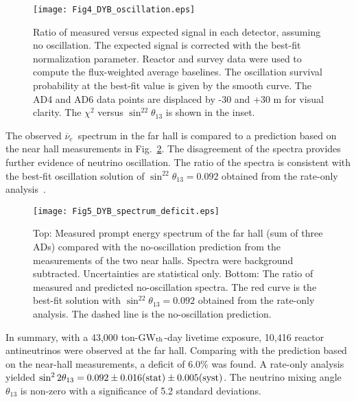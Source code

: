 \documentclass[aps,prl,showpacs,showkeys,amsmath,amssymb,
twocolumn,
floatfix,
superscriptaddress
]{revtex4-1}
\newcommand{\nuebar}{$\overline{\nu}_{e}$}
\begin{document}
\begin{figure}[htb]
\texttt{[image: Fig4\_DYB\_oscillation.eps]}
\caption{
Ratio of measured versus expected signal in each detector, assuming no oscillation. The expected signal is corrected with the best-fit normalization parameter. Reactor and survey data were used to compute the flux-weighted average baselines. The oscillation survival probability at the best-fit value is given by the smooth curve. The AD4 and AD6 data points are displaced by -30 and +30 m for visual clarity. The $\chi^2$ versus $\sin^22\theta_{13}$ is shown in the inset. \label{fig:osc}}
\end{figure}


\par
The observed \nuebar\  spectrum in the far hall is compared to a prediction based on the near hall measurements in Fig.~\ref{fig:spec}. The disagreement of the spectra provides further evidence of neutrino oscillation. The ratio of the spectra is consistent with the best-fit oscillation solution of $\sin^22\theta_{13}=0.092$ obtained from the rate-only analysis~\cite{fnshape}.


\begin{figure}[htb]
\texttt{[image: Fig5\_DYB\_spectrum\_deficit.eps]}
\caption{Top: Measured prompt energy spectrum of the far hall (sum of three ADs) compared with the no-oscillation prediction from the measurements of the two near halls. Spectra were background subtracted. Uncertainties are statistical only. Bottom: The ratio of measured and predicted no-oscillation spectra. The red curve is the best-fit solution with $\sin^22\theta_{13}=0.092$ obtained from the rate-only analysis. The dashed line is the no-oscillation prediction.  \label{fig:spec}}
\end{figure}


\par
In summary, with a 43,000 ton-GW$_{\rm th}$-day livetime exposure, 10,416 reactor antineutrinos were observed at the far hall. Comparing with the prediction based on the near-hall measurements, a deficit of 6.0\% was found.
A rate-only analysis yielded $\sin^22\theta_{13}=0.092\pm 0.016({\rm stat})\pm0.005({\rm syst})$.
The neutrino mixing angle $\theta_{13}$ is non-zero with a significance of 5.2 standard deviations.
\end{document}
